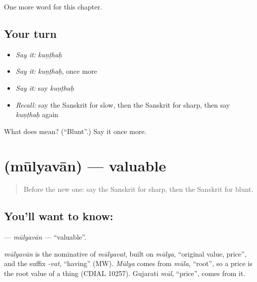 \begin{grammarlens}[title={What you've built}]
One more word for this chapter.
\end{grammarlens}

\subsection*{Your turn}
\begin{itemize}
\raggedright
  \item \emph{Say it:} \emph{kuṇṭhaḥ}
  \item \emph{Say it:} \emph{kuṇṭhaḥ}, once more
  \item \emph{Say it:} say \emph{kuṇṭhaḥ}
  \item \emph{Recall:} say the Sanskrit for slow, then the Sanskrit for sharp, then say \emph{kuṇṭhaḥ} again
\end{itemize}

\begin{tcolorbox}[breakable,colback=teal!4,colframe=teal!35!black,title={Before you move on}]
What does  mean? (\textquotedblleft{}Blunt\textquotedblright{}.) Say it once more.
\end{tcolorbox}
\section[\texorpdfstring{\sk{मूल्यवान्} (mūlyavān)}{मूल्यवान् (mūlyavān)}]{ (mūlyavān) — valuable}

\label{lesson:SA-C215-mulyavan}



\begin{quote}
Before the new one: say the Sanskrit for sharp, then the Sanskrit for blunt.
\end{quote}

\subsection*{You'll want to know: }
\textbf{} — \emph{mūlyavān} — \textquotedblleft{}valuable\textquotedblright{}.

\begin{cousinweb}
\emph{mūlyavān} is the nominative of \emph{mūlyavat}, built on \emph{mūlya}, \textquotedblleft{}original value, price\textquotedblright{}, and the suffix \emph{-vat}, \textquotedblleft{}having\textquotedblright{} (MW). \emph{Mūlya} comes from \emph{mūla}, \textquotedblleft{}root\textquotedblright{}, so a price is the root value of a thing (CDIAL 10257). Gujarati \emph{mūl}, \textquotedblleft{}price\textquotedblright{}, comes from it.
\end{cousinweb}

